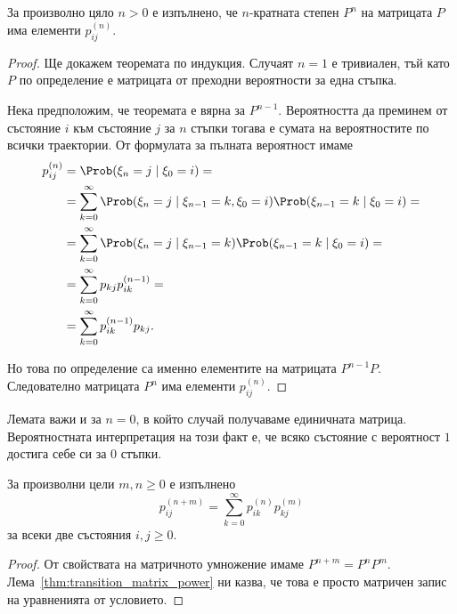 \documentclass[numbers=endperiod, bibliography=totocnumbered]{scrartcl}
\begin{document}
\begin{lemma}\label{thm:transition_matrix_power}
  За произволно цяло \( n > 0 \) е изпълнено, че \( n \)-кратната степен \( P^n \) на матрицата \( P \) има елементи \( p_{ij}^{(n)} \).
\end{lemma}
\begin{proof}
  Ще докажем теоремата по индукция. Случаят \( n = 1 \) е тривиален, тъй като \( P \) по определение е матрицата от преходни вероятности за една стъпка.

  Нека предположим, че теоремата е вярна за \( P^{n-1} \). Вероятността да преминем от състояние \( i \) към състояние \( j \) за \( n \) стъпки тогава е сумата на вероятностите по всички траектории. От формулата за пълната вероятност имаме
  \begin{align*}
    p^{(n)}_{ij}
    &=
    \Prob(\xi_n = j \mid \xi_0 = i)
    = \\ &=
    \sum_{k=0}^\infty \Prob(\xi_n = j \mid \xi_{n-1} = k, \xi_0 = i) \Prob(\xi_{n-1} = k \mid \xi_0 = i)
    = \\ &=
    \sum_{k=0}^\infty \Prob(\xi_n = j \mid \xi_{n-1} = k) \Prob(\xi_{n-1} = k \mid \xi_0 = i)
    = \\ &=
    \sum_{k=0}^\infty p_{kj} p^{(n-1)}_{ik}
    = \\ &=
    \sum_{k=0}^\infty p^{(n-1)}_{ik} p_{kj}.
  \end{align*}

  Но това по определение са именно елементите на матрицата \( P^{n-1} P \). Следователно матрицата \( P^n \) има елементи \( p^{(n)}_{ij} \).
\end{proof}

\begin{remark}
  Лемата важи и за \( n = 0 \), в който случай получаваме единичната матрица. Вероятностната интерпретация на този факт е, че всяко състояние с вероятност \( 1 \) достига себе си за \( 0 \) стъпки.
\end{remark}

\begin{theorem}\label{thm:chapman_kolmogorov}
  За произволни цели \( m, n \geq 0 \) е изпълнено
  \begin{equation*}
    p^{(n+m)}_{ij} = \sum_{k=0}^\infty p^{(n)}_{ik} p^{(m)}_{kj}
  \end{equation*}
  за всеки две състояния \( i, j \geq 0 \).
\end{theorem}
\begin{proof}
  От свойствата на матричното умножение имаме \( P^{n+m} = P^n P^m \). Лема~\ref{thm:transition_matrix_power} ни казва, че това е просто матричен запис на уравненията от условието.
\end{proof}
\end{document}
